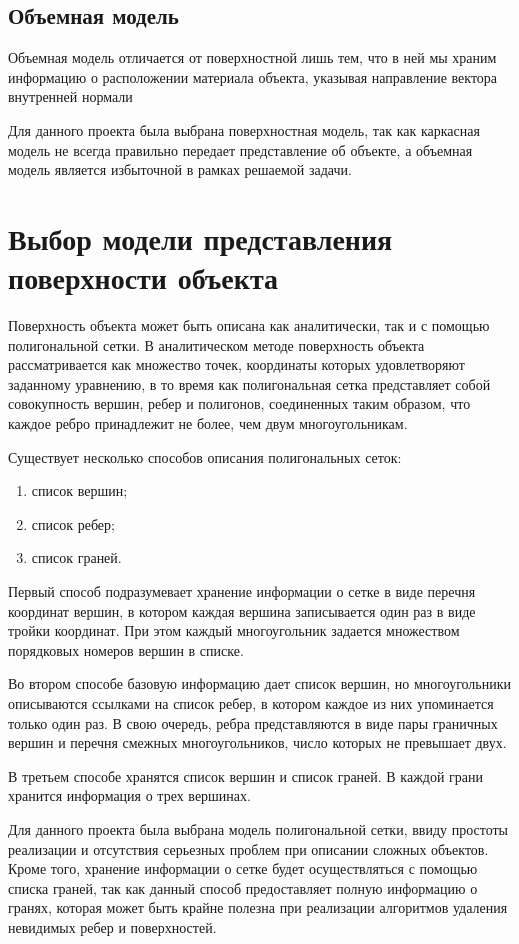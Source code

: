 \subsection{Объемная модель}
Объемная модель отличается от поверхностной лишь тем, что в ней мы храним информацию о расположении материала объекта, указывая направление вектора внутренней нормали

Для данного проекта была выбрана поверхностная модель, так как каркасная модель не всегда правильно передает представление об объекте, а объемная модель является избыточной в рамках решаемой задачи.

\section{Выбор модели представления поверхности объекта}

Поверхность объекта может быть описана как аналитически, так и с помощью полигональной сетки. В аналитическом методе поверхность объекта рассматривается как множество точек, координаты которых удовлетворяют заданному уравнению, в то время как полигональная сетка представляет собой совокупность вершин, ребер и полигонов, соединенных таким образом, что каждое ребро принадлежит не более, чем двум многоугольникам.

Существует несколько способов описания полигональных сеток:

\begin{enumerate}
	\item список вершин;
	\item список ребер;
	\item список граней.
\end{enumerate}

Первый способ подразумевает хранение информации о сетке в виде перечня координат вершин, в котором каждая вершина записывается один раз в виде тройки координат. При этом каждый многоугольник задается множеством порядковых номеров вершин в списке.

Во втором способе базовую информацию дает список вершин, но многоугольники описываются ссылками на список ребер, в котором каждое из них упоминается только один раз. В свою очередь, ребра представляются в виде пары граничных вершин и перечня смежных многоугольников, число которых не превышает двух.

В третьем способе хранятся список вершин и список граней. В каждой грани хранится информация о трех вершинах.

Для данного проекта была выбрана модель полигональной сетки, ввиду простоты реализации и отсутствия серьезных проблем при описании сложных объектов. Кроме того, хранение информации о сетке будет осуществляться с помощью списка граней, так как данный способ предоставляет полную информацию о гранях, которая может быть крайне полезна при реализации алгоритмов удаления невидимых ребер и поверхностей.

